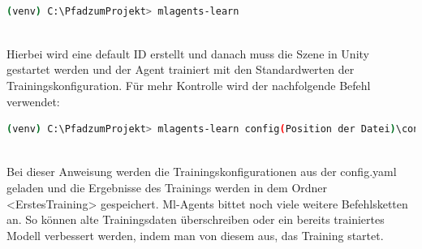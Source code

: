\\
\begin{lstlisting}[language=bash,numbers=none]
	(venv) C:\PfadzumProjekt> mlagents-learn
\end{lstlisting}
\noindent
\\
Hierbei wird eine default ID erstellt und danach muss die Szene in Unity gestartet werden und der Agent trainiert mit den Standardwerten der Trainingskonfiguration. Für mehr Kontrolle wird der nachfolgende Befehl verwendet:
\\
\begin{lstlisting}[language=bash,numbers=none]
	(venv) C:\PfadzumProjekt> mlagents-learn config(Position der Datei)\config.yaml(Dateiname) --run-id=ErstesTraining(ID)
\end{lstlisting}
\noindent
\\
Bei dieser Anweisung werden die Trainingskonfigurationen aus der config.yaml geladen und die Ergebnisse des Trainings werden in dem Ordner <ErstesTraining> gespeichert. Ml-Agents bittet noch viele weitere Befehlsketten an. So können alte Trainingsdaten überschreiben oder ein bereits trainiertes Modell verbessert werden, indem man von diesem aus, das Training startet. 